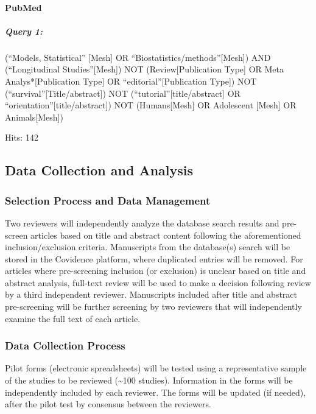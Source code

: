 \documentclass[
]{article}
\let\oldparagraph\paragraph
\renewcommand{\paragraph}[1]{\oldparagraph{#1}\mbox{}}
\let\oldsubparagraph\subparagraph
\renewcommand{\subparagraph}[1]{\oldsubparagraph{#1}\mbox{}}
\begin{document}
\hypertarget{pubmed-1}{%
\paragraph{PubMed}\label{pubmed-1}}

\hypertarget{query-1}{%
\subparagraph{Query 1:}\label{query-1}}

(``Models, Statistical'' {[}Mesh{]} OR
``Biostatistics/methods''{[}Mesh{]}) AND (``Longitudinal
Studies''{[}Mesh{]}) NOT (Review{[}Publication Type{]} OR Meta
Analys*{[}Publication Type{]} OR ``editorial''{[}Publication Type{]})
NOT (``survival''{[}Title/abstract{]}) NOT
(``tutorial''{[}title/abstract{]} OR
``orientation''{[}title/abstract{]}) NOT (Humans{[}Mesh{]} OR Adolescent
{[}Mesh{]} OR Animals{[}Mesh{]})

Hits: 142

\hypertarget{data-collection-and-analysis}{%
\subsection{Data Collection and
Analysis}\label{data-collection-and-analysis}}

\hypertarget{selection-process-and-data-management}{%
\subsubsection{Selection Process and Data
Management}\label{selection-process-and-data-management}}

Two reviewers will independently analyze the database search results and
pre-screen articles based on title and abstract content following the
aforementioned inclusion/exclusion criteria. Manuscripts from the
database(s) search will be stored in the Covidence platform, where
duplicated entries will be removed. For articles where pre-screening
inclusion (or exclusion) is unclear based on title and abstract
analysis, full-text review will be used to make a decision following
review by a third independent reviewer. Manuscripts included after title
and abstract pre-screening will be further screening by two reviewers
that will independently examine the full text of each article.

\hypertarget{data-collection-process}{%
\subsubsection{Data Collection Process}\label{data-collection-process}}

Pilot forms (electronic spreadsheets) will be tested using a
representative sample of the studies to be reviewed (\textasciitilde100
studies). Information in the forms will be independently included by
each reviewer. The forms will be updated (if needed), after the pilot
test by consensus between the reviewers.
\end{document}
